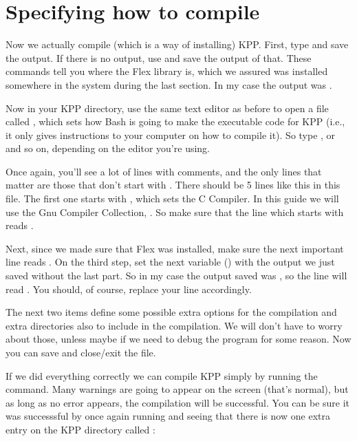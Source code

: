 \documentclass[letterpaper,10pt,openany,oneside]{sphinxmanual}
\begin{document}
\section{Specifying how to compile}
\label{compiling:specifying-how-to-compile}
Now we actually compile (which is a way of installing) KPP. First, type
 and save the output. If there is no output, use  and save the output of that. These commands tell you where the Flex
library is, which we assured was installed somewhere in the system during the
last section. In my case the output was .

Now in your KPP directory, use the same text editor as before to open a file
called , which sets how Bash is going to make the executable
code for KPP (i.e., it only gives instructions to your computer on how to
compile it). So type , or  and so
on, depending on the editor you're using.

Once again, you'll see a lot of lines with comments, and the only lines that
matter are those that don't start with \sphinxcode{\#}. There should be 5 lines like this
in this file. The first one starts with , which sets the C Compiler. In
this guide we will use the Gnu Compiler Collection, . So make sure that
the line which starts with  reads .

Next, since we made sure that Flex was installed, make sure the next important
line reads . On the third step, set the next variable
() with the output we just saved without the last part. So in
my case the output saved was , so the line
will read . You should, of course,
replace your line accordingly.

The next two items define some possible extra options for the compilation and
extra directories also to include in the compilation. We will don't have to
worry about those, unless maybe if we need to debug the program for some
reason. Now you can save and close/exit the file.

If we did everything correctly we can compile KPP simply by running the
 command. Many warnings are going to appear on the screen (that's
normal), but as long as no error appears, the compilation will be successful.
You can be sure it was successsful by once again running  and seeing that
there is now one extra entry on the KPP directory called :
\end{document}
